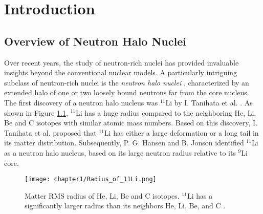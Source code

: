 \chapter{Introduction}

\section{Overview of Neutron Halo Nuclei}
Over recent years, the study of neutron-rich nuclei has provided invaluable insights beyond the conventional nuclear models. A particularly intriguing subclass of neutron-rich nuclei is the \textit{neutron halo nuclei} \cite{Tanihata96}\cite{Tanihata13}, characterized by an extended halo of one or two loosely bound neutrons far from the core nucleus. The first discovery of a neutron halo nucleus was $^{11}$Li by I. Tanihata et al. \cite{Tanihata85}. As shown in Figure \ref{fig:Radius_11Li}, $^{11}$Li has a huge radius compared to the neighboring He, Li, Be and C isotopes with similar atomic mass numbers. Based on this discovery, I. Tanihata et al. proposed that $^{11}$Li has either a large deformation or a long tail in its matter distribution. Subsequently, P. G. Hansen and B. Jonson \cite{HansenandJonson} identified $^{11}$Li as a neutron halo nucleus, based on its large neutron radius relative to its $^{9}$Li core.

\begin{figure}
    \centering
    \texttt{[image: chapter1/Radius\_of\_11Li.png]}
    \caption[Matter RMS radius of He, Li, Be and C isotopes\cite{Tanihata85}]{Matter RMS radius of He, Li, Be and C isotopes. $^{11}$Li has a significantly larger radius than its neighbors He, Li, Be, and C \cite{Tanihata85}.}
    \label{fig:Radius_11Li}
\end{figure}

